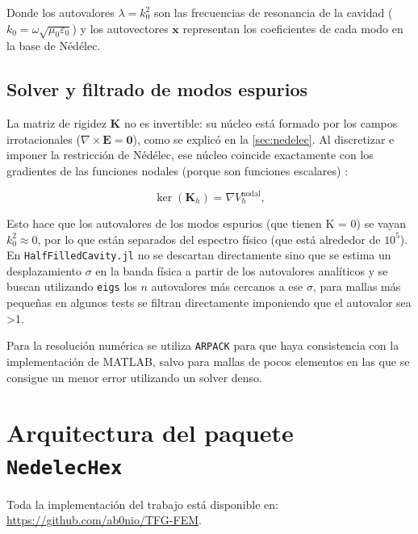 \documentclass[12pt]{report} %
\begin{document}
 Donde los autovalores $\lambda=k_0^2$ son las frecuencias de resonancia de la cavidad ($k_0=\omega\sqrt{\mu_0\varepsilon_0}$) y los autovectores $\mathbf{x}$ representan los coeficientes de cada modo en la base de Nédélec.

\subsection{Solver y filtrado de modos espurios}\label{sec:nucleo}
La matriz de rigidez $\mathbf{K}$ no es invertible: su núcleo está formado por los campos irrotacionales ($\nabla\times\mathbf{E}=\mathbf{0}$), como se explicó en la \autoref{sec:nedelec}. Al discretizar e imponer la restricción de Nédélec, ese núcleo coincide exactamente con los gradientes de las funciones nodales (porque son funciones escalares) \cite{ davidson2003, jacobsson2007nedelec}:

\begin{equation}\label{eq:nucleo-discreto}
	\ker(\mathbf{K}_h) = \nabla V_h^{\text{nodal}},
\end{equation}

Esto hace que los autovalores de los modos espurios (que tienen K = 0) se vayan  $k_0^2\approx 0$, por lo que están separados del espectro físico (que está alrededor de  $10^5$). En \texttt{HalfFilledCavity.jl} no se descartan directamente  sino que se estima un desplazamiento $\sigma$ en la banda física a partir de los autovalores analíticos y se buscan utilizando \texttt{eigs} los $n$ autovalores más cercanos a ese $\sigma$, para mallas más pequeñas en algunos tests se filtran directamente imponiendo que el autovalor sea >1.

Para la resolución numérica se utiliza \texttt{ARPACK} para que haya consistencia con la implementación de MATLAB, salvo para mallas de pocos elementos en las que se consigue un menor error utilizando un solver denso.

\section{Arquitectura del paquete \texttt{NedelecHex}}\label{sec:arquitectura}

Toda la implementación del trabajo está disponible en: \url{https://github.com/ab0nio/TFG-FEM}.
\end{document}
